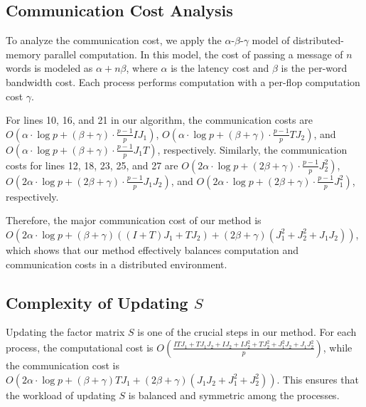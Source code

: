 \documentclass[journal]{IEEEtran}
\begin{document}
\subsection{Communication Cost Analysis}

To analyze the communication cost, we apply the $\alpha$-$\beta$-$\gamma$ model of distributed-memory parallel computation. In this model, the cost of passing a message of $n$ words is modeled as $\alpha + n\beta$, where $\alpha$ is the latency cost and $\beta$ is the per-word bandwidth cost. Each process performs computation with a per-flop computation cost $\gamma$.


For lines 10, 16, and 21 in our algorithm, the communication costs are $O\left(\alpha \cdot \log p + (\beta + \gamma) \cdot \frac{p-1}{p} IJ_1\right)$, $O\left(\alpha \cdot \log p + (\beta + \gamma) \cdot \frac{p-1}{p} TJ_2\right)$, and $O\left(\alpha \cdot \log p + (\beta + \gamma) \cdot \frac{p-1}{p} J_1T\right)$, respectively. Similarly, the communication costs for lines 12, 18, 23, 25, and 27 are $O\left(2\alpha \cdot \log p + (2\beta + \gamma) \cdot \frac{p-1}{p} J_2^2\right)$, $O\left(2\alpha \cdot \log p + (2\beta + \gamma) \cdot \frac{p-1}{p} J_1J_2\right)$, and $O\left(2\alpha \cdot \log p + (2\beta + \gamma) \cdot \frac{p-1}{p} J_1^2\right)$, respectively.

Therefore, the major communication cost of our method is $O\left(2\alpha \cdot \log p + (\beta + \gamma)((I + T)J_1 + TJ_2) + (2\beta + \gamma)(J_1^2 + J_2^2 + J_1J_2)\right)$, which shows that our method effectively balances computation and communication costs in a distributed environment.

\subsection{Complexity of Updating $S$}

Updating the factor matrix $S$ is one of the crucial steps in our method. For each process, the computational cost is $O\left(\frac{ITJ_1 + TJ_1J_2 + IJ_2 + IJ_2^2 + TJ_2^2 + J_1^2J_2 + J_1J_2^2}{p}\right)$, while the communication cost is $O(2\alpha \cdot \log p + (\beta + \gamma)TJ_1 + (2\beta + \gamma)(J_1J_2 + J_1^2 + J_2^2))$. This ensures that the workload of updating $S$ is balanced and symmetric among the processes.
\end{document}
